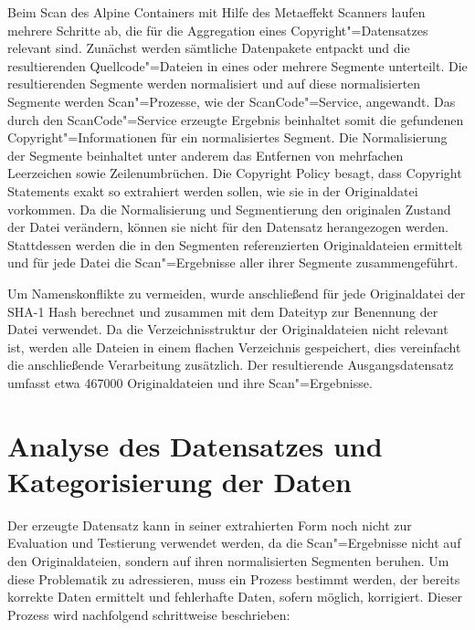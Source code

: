 Beim Scan des Alpine Containers mit Hilfe des Metaeffekt Scanners laufen mehrere Schritte ab, die für die Aggregation eines Copyright"=Datensatzes relevant sind.
Zunächst werden sämtliche Datenpakete entpackt und die resultierenden Quellcode"=Dateien in eines oder mehrere Segmente unterteilt.
Die resultierenden Segmente werden normalisiert und auf diese normalisierten Segmente werden Scan"=Prozesse, wie der ScanCode"=Service, angewandt.
Das durch den ScanCode"=Service erzeugte Ergebnis beinhaltet somit die gefundenen Copyright"=Informationen für ein normalisiertes Segment.
Die Normalisierung der Segmente beinhaltet unter anderem das Entfernen von mehrfachen Leerzeichen sowie Zeilenumbrüchen.
Die Copyright Policy besagt, dass Copyright Statements exakt so extrahiert werden sollen, wie sie in der Originaldatei vorkommen.
Da die Normalisierung und Segmentierung den originalen Zustand der Datei verändern, können sie nicht für den Datensatz herangezogen werden.
Stattdessen werden die in den Segmenten referenzierten Originaldateien ermittelt und für jede Datei die Scan"=Ergebnisse aller ihrer Segmente zusammengeführt.

Um Namenskonflikte zu vermeiden, wurde anschließend für jede Originaldatei der SHA-1 Hash berechnet und zusammen mit dem Dateityp zur Benennung der Datei verwendet.
Da die Verzeichnisstruktur der Originaldateien nicht relevant ist, werden alle Dateien in einem flachen Verzeichnis gespeichert, dies vereinfacht die anschließende Verarbeitung zusätzlich.
Der resultierende Ausgangsdatensatz umfasst etwa 467000 Originaldateien und ihre Scan"=Ergebnisse.

\section{Analyse des Datensatzes und Kategorisierung der Daten}\label{sec:analyse-datensatz}

Der erzeugte Datensatz kann in seiner extrahierten Form noch nicht zur Evaluation und Testierung verwendet werden, da die Scan"=Ergebnisse nicht auf den Originaldateien, sondern auf ihren normalisierten Segmenten beruhen.
Um diese Problematik zu adressieren, muss ein Prozess bestimmt werden, der bereits korrekte Daten ermittelt und fehlerhafte Daten, sofern möglich, korrigiert.
Dieser Prozess wird nachfolgend schrittweise beschrieben:

